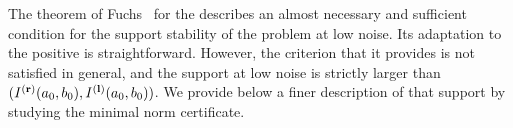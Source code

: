 The theorem of Fuchs~\cite{fuchs2004on-sp} for the \lasso describes an almost necessary and sufficient condition for the support stability of the problem at low noise. Its adaptation to the positive \lasso is straightforward. 
However, the criterion that it provides is not satisfied in general, and the support at low noise is strictly larger than $({I^{\mathbf{(r)}}}(a_0,b_0),{I^{\mathbf{(l)}}}(a_0,b_0))$. We provide below a finer description of that support by studying the minimal norm certificate.

